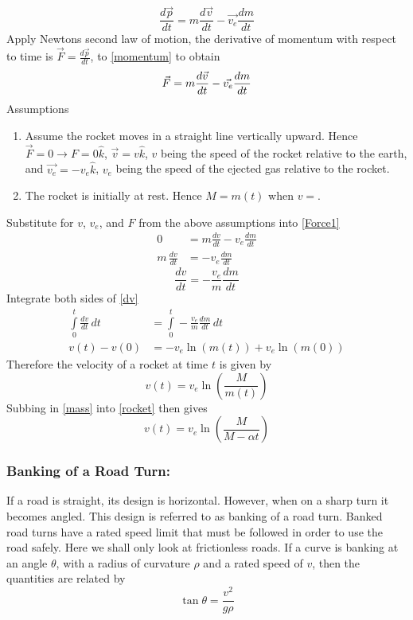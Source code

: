 \documentclass[14pt]{article}
\begin{document}
    \begin{equation}\label{momentum}
        \frac{d\vec p}{d t}=m \frac{d\vec v}{d t}-\vec{v_e}\frac{d m}{d t}
    \end{equation}
    Apply Newtons second law of motion, the derivative of momentum with respect to time is $\vec F=\frac{d\vec p}{dt}$, to \eqref{momentum} to obtain
    \begin{equation}\label{Force1}
        \vec F=m \frac{d\vec v}{d t}-\vec{v_e}\frac{d m}{d t}\\
    \end{equation}
    Assumptions
    \begin{enumerate}
        \item Assume the rocket moves in a straight line vertically upward. Hence $\vec F=0\rightarrow F=0\hat k$, $\vec v=v\hat k$, $v$ being the speed of the rocket relative to the earth, and $\vec{v_e}=-v_e\hat k$, $v_e$ being the speed of the ejected gas relative to the rocket.
        \item The rocket is initially at rest. Hence $M=m(t)$ when $v=$.
    \end{enumerate}
    Substitute for $v$, $v_e$, and $F$ from the above assumptions into \eqref{Force1}
    \begin{align*}
        0&=m\frac{dv}{dt}-v_e\frac{dm}{dt}\\
        m\, \frac{dv}{dt}&=-v_e\frac{dm}{dt}   
    \end{align*}
    \begin{equation}\label{dv}
        \frac{dv}{dt}=-\frac{v_e} {m}\frac{dm}{dt}
    \end{equation}
    Integrate both sides of \eqref{dv}
    \begin{align*}
        \int\limits_0^t \frac{dv}{dt}\, dt&=\int\limits_0^t -\frac{v_e} {m}\frac{dm}{dt}\, dt\\
        v(t)-v(0)&=-v_e\ln(m(t))+v_e\ln(m(0))
    \end{align*}
    Therefore the velocity of a rocket at time $t$ is given by
    \begin{equation}\label{rocket}
        v(t)=v_e\ln\left(\frac{M}{m(t)}\right)
    \end{equation}
    Subbing in \eqref{mass} into \eqref{rocket} then gives
    $$v(t)=v_e\ln\left(\frac{M}{M-\alpha t}\right)$$
    
    \subsubsection{Banking of a Road Turn:}
    If a road is straight, its design is horizontal. However, when on a sharp turn it becomes angled. This design is referred to as banking of a road turn. Banked road turns have a rated speed limit that must be followed in order to use the road safely. Here we shall only look at frictionless roads. If a curve is banking at an angle $\theta$, with a radius of curvature $\rho$ and a rated speed of $v$, then the quantities are related by
    $$\tan \theta=\frac{v^2}{g\rho}$$ 
    \pagebreak
\end{document}
